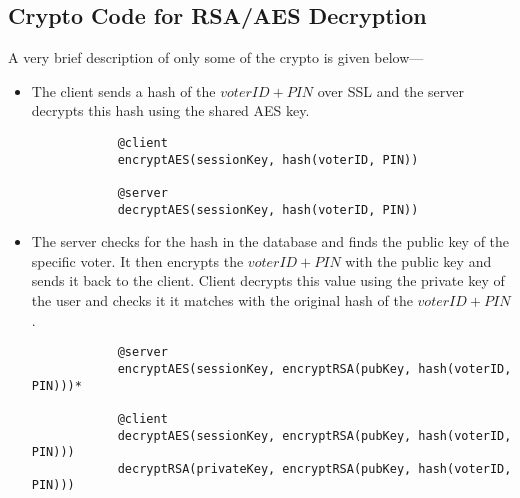 \subsection{Crypto Code for RSA/AES Decryption}

A very brief description of only some of the crypto is given below---

\begin{itemize}
	\item The client sends a hash of the $voterID + PIN$ over SSL and the server decrypts this hash using the shared AES key.
		\begin{verbatim}
			@client
			encryptAES(sessionKey, hash(voterID, PIN))
				
			@server
			decryptAES(sessionKey, hash(voterID, PIN))
		\end{verbatim}
	\item The server checks for the hash in the database and finds the public key of the specific voter. It then encrypts the $voterID + PIN$ with the public key and sends it back to the client. Client decrypts this value using the private key of the user and checks it it matches with the original hash of the $voterID + PIN$.
		\begin{verbatim}
			@server
			encryptAES(sessionKey, encryptRSA(pubKey, hash(voterID, PIN)))*
				
			@client
			decryptAES(sessionKey, encryptRSA(pubKey, hash(voterID, PIN)))
			decryptRSA(privateKey, encryptRSA(pubKey, hash(voterID, PIN)))
		\end{verbatim}
	\end{itemize}
